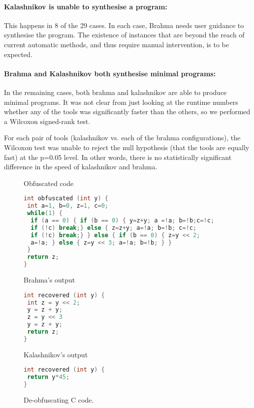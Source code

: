 \paragraph{\bf {\sc Kalashnikov} is unable to synthesise a program:}
This happens in 8 of the 29 cases.  In each case, {\sc Brahma} needs user guidance to synthesise the program.
The existence of instances that are beyond the reach of current automatic
methods, and thus require manual intervention, is to be expected.
\paragraph{\bf {\sc Brahma} and {\sc Kalashnikov} both synthesise minimal programs:}
In the remaining cases, both {\sc brahma} and {\sc kalashnikov} are able to produce
minimal programs.  It was not clear from just looking at the runtime numbers whether
any of the tools was significantly faster than the others, so we performed a Wilcoxon signed-rank test.

For each pair of tools ({\sc kalashnikov} vs. each of the {\sc brahma} configurations), the Wilcoxon test was
unable to reject the null hypothesis (that the tools are equally fast) at the p=0.05 level. In other words,
there is no statistically significant difference in the speed of {\sc kalashnikov} and {\sc brahma}.

\begin{figure}
Obfuscated code

\begin{lstlisting}[frame=single,language=c]
int obfuscated (int y) {
 int a=1, b=0, z=1, c=0;
 while(1) {
  if (a == 0) { if (b == 0) { y=z+y; a =!a; b=!b;c=!c;
  if (!c) break;} else { z=z+y; a=!a; b=!b; c=!c;
  if (!c) break;} } else { if (b == 0) { z=y << 2;
  a=!a; } else { z=y << 3; a=!a; b=!b; } }
 }
 return z;
}
\end{lstlisting}

\begin{minipage}[t]{.45\textwidth}
{\sc Brahma}'s output

\begin{lstlisting}[language=c,frame=single]
int recovered (int y) {
 int z = y << 2;
 y = z + y;
 z = y << 3
 y = z + y;
 return z;
}
\end{lstlisting}
\end{minipage}
\hfill
\begin{minipage}[t]{.45\textwidth}
{\sc Kalashnikov}'s output
 \begin{lstlisting}[language=c,frame=single]
int recovered (int y) {
 return y*45;
}
\end{lstlisting}
\end{minipage}

 \caption{De-obfuscating  C code.
  \label{fig:obfuscated}}
\end{figure}

